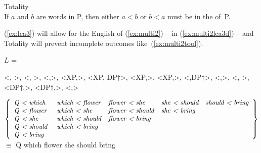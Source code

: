 \documentclass[output=paper]{langsci/langscibook}
\begin{document}
\begin{exe}
	\ex \label{ex:totality} Totality\\
	If $a$ and $b$ are words in P, then either $a<b$ or $b<a$ must be in the  of~P.
\end{exe}

(\ref{ex:lca3}) will allow for the English  of (\ref{ex:multi2}) -- in (\ref{ex:multi2lca3d}) -- and Totality will prevent incomplete outcomes like~(\ref{ex:multi2tool}).
\begin{exe}
	\ex \label{ex:multi2lca3d}
	\begin{xlist}
		\small
			\ex $L$ = \parbox[t]{4in}{<, >, <, >, <,>, <XP,>, <XP, DP$\dag$>, <XP,>, <XP,>, <,DP$\dag$>, <,>, <, >, <DP$\dag$,>, <DP$\dag$,>, <,>}
			\ex %
			\hspace*{-5pt}
			\footnotesize
			$\left\{
				\begin{array}{lllll}
\text{\emph{Q < which  }} & \text{\emph{which < flower}} & \text{\emph{flower < she}}    & \text{\emph{she < should}} & \text{\emph{should < bring}} \\%
\text{\emph{Q < flower }} & \text{\emph{which < she   }} & \text{\emph{flower < should}} & \text{\emph{she < bring }} \\%
\text{\emph{Q < she    }} & \text{\emph{which < should}} & \text{\emph{flower < bring }}                              \\
\text{\emph{Q < should }} & \text{\emph{which < bring }}                                                              \\
\text{\emph{Q < bring  }} &                                                                                           \\
				\end{array}
			\right\}$\\[5pt]
            \normalsize
			$\equiv$ Q which flower she should bring
	\end{xlist}
\end{exe}
\end{document}
